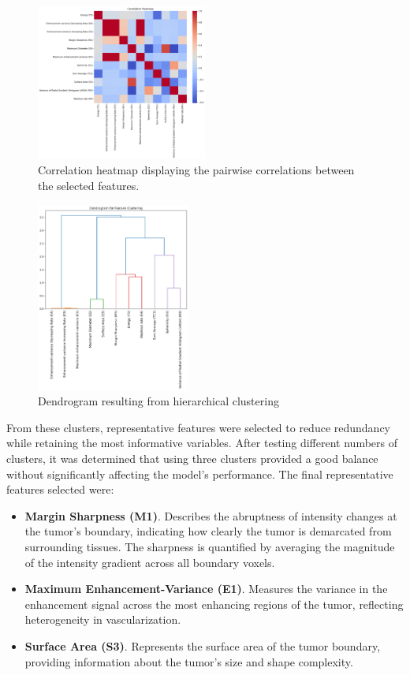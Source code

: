 \documentclass[conference]{IEEEtran}
\begin{document}
\begin{figure}
    \centering
    \includegraphics[width=0.5\textwidth]{images/correlation_heatmat.png}
    \caption{Correlation heatmap displaying the pairwise correlations between the selected features.}
    \label{fig:correlation_heatmap}
\end{figure}

\begin{figure}
    \centering
    \includegraphics[width=0.45\textwidth]{images/dendrogram.png}
    \caption{Dendrogram resulting from hierarchical clustering}
    \label{fig:dendrogram}
\end{figure}

From these clusters, representative features were selected to reduce redundancy while retaining the most informative variables. After testing different numbers of clusters, it was determined that using three clusters provided a good balance without significantly affecting the model’s performance. The final representative features selected were:

\begin{itemize}
    \item \textbf{Margin Sharpness (M1)}. Describes the abruptness of intensity changes at the tumor’s boundary, indicating how clearly the tumor is demarcated from surrounding tissues. The sharpness is quantified by averaging the magnitude of the intensity gradient across all boundary voxels.

    \item \textbf{Maximum Enhancement-Variance (E1)}. Measures the variance in the enhancement signal across the most enhancing regions of the tumor, reflecting heterogeneity in vascularization.

    \item \textbf{Surface Area (S3)}. Represents the surface area of the tumor boundary, providing information about the tumor’s size and shape complexity. 
\end{itemize}
\end{document}
